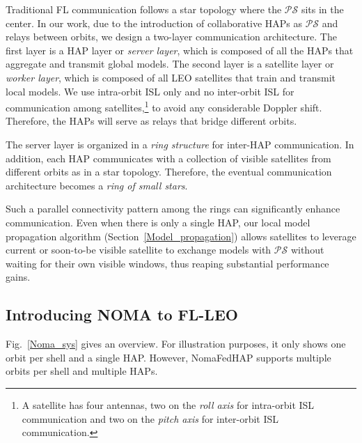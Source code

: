 \documentclass[letter,journal]{IEEEtran}
\newcommand{\sref}[1]{Section~\ref{#1}}
\begin{document}
Traditional FL communication follows a star topology where the $\mathcal {PS}$ sits in the center. In our work, due to the introduction of collaborative HAPs as $\mathcal {PS}$ and relays between orbits, we design a two-layer communication architecture. The first layer is a HAP layer or \textit{server layer}, which is composed of all the HAPs that aggregate and transmit global models. %
The second layer is a satellite layer or \textit{worker layer}, which is composed of all LEO satellites that train and transmit local models. We use intra-orbit ISL only and no inter-orbit ISL for communication among satellites,\footnote{A satellite has four antennas, two on the \textit{roll axis} for intra-orbit ISL communication and two on the \textit{pitch axis} for inter-orbit ISL communication.} to avoid any considerable Doppler shift. Therefore, the HAPs will serve as relays that bridge different orbits.

The server layer is organized in a {\em ring structure} for inter-HAP communication. In addition, each HAP communicates with a collection of visible satellites from different orbits as in a star topology. Therefore, the eventual communication architecture becomes a \textit{ring of small stars}.

Such a parallel connectivity pattern among the rings can significantly enhance communication. Even when there is only a single HAP, our local model propagation algorithm (\sref{Model_propagation}) allows satellites to leverage current or soon-to-be visible satellite to exchange models with $\mathcal {PS}$ without waiting for their own visible windows, thus reaping substantial performance gains.


\subsection{Introducing NOMA to FL-LEO}\label{sec:noma}

Fig.~\ref{Noma_sys} gives an overview. For illustration purposes, it only shows one orbit per shell and a single HAP. However, NomaFedHAP supports multiple orbits per shell and multiple HAPs. %
\end{document}
